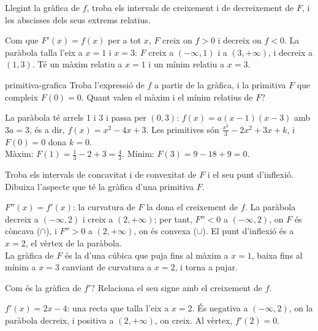 \begin{apartats}

Llegint la gràfica de $f$, troba els intervals de creixement i de decreixement de $F$, i les abscisses
dels seus extrems relatius.

\begin{solucio}
Com que $F'(x)=f(x)$ per a tot $x$, $F$ creix on $f>0$ i decreix on $f<0$. La paràbola talla l'eix a
$x=1$ i $x=3$: $F$ creix a $(-\infty,1)$ i a $(3,+\infty)$, i decreix a $(1,3)$. Té un màxim relatiu a
$x=1$ i un mínim relatiu a $x=3$.
\end{solucio}

\begin{tria}{primitiva-grafica}
Troba l'expressió de $f$ a partir de la gràfica, i la primitiva $F$ que compleix $F(0)=0$. Quant valen
el màxim i el mínim relatius de $F$?

\begin{solucio}
La paràbola té arrels 1 i 3 i passa per $(0,3)$: $f(x)=a(x-1)(x-3)$ amb $3a=3$, és a dir,
$f(x)=x^2-4x+3$. Les primitives són $\frac{x^3}{3}-2x^2+3x+k$, i $F(0)=0$ dona $k=0$.\\
Màxim: $F(1)=\frac13-2+3=\frac43$. Mínim: $F(3)=9-18+9=0$.
\end{solucio}

Troba els intervals de concavitat i de convexitat de $F$ i el seu punt d'inflexió. Dibuixa l'aspecte
que té la gràfica d'una primitiva $F$.

\begin{solucio}
$F''(x)=f'(x)$: la curvatura de $F$ la dona el creixement de $f$. La paràbola decreix a $(-\infty,2)$ i
creix a $(2,+\infty)$; per tant, $F''<0$ a $(-\infty,2)$, on $F$ és còncava ($\cap$), i $F''>0$ a
$(2,+\infty)$, on és convexa ($\cup$). El punt d'inflexió és a $x=2$, el vèrtex de la paràbola.\\
La gràfica de $F$ és la d'una cúbica que puja fins al màxim a $x=1$, baixa fins al mínim a $x=3$
canviant de curvatura a $x=2$, i torna a pujar.
\end{solucio}
\end{tria}

\begin{nomesllarg}
Com és la gràfica de $f'$? Relaciona el seu signe amb el creixement de $f$.

\begin{solucio}
$f'(x)=2x-4$: una recta que talla l'eix a $x=2$. És negativa a $(-\infty,2)$, on la paràbola decreix, i
positiva a $(2,+\infty)$, on creix. Al vèrtex, $f'(2)=0$.
\end{solucio}
\end{nomesllarg}

\end{apartats}
